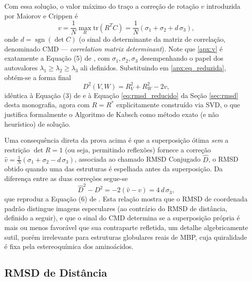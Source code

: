 \documentclass[12pt, a4paper]{article}
\DeclareMathOperator{\sgn}{sgn}
\theoremstyle{plain}
\theoremstyle{definition}
\theoremstyle{remark}
\newcommand{\ident}{\hspace{2em}}
\begin{document}
\ident Com essa solução, o valor máximo do traço a correção de rotação $v$ introduzida por Maiorov e Crippen \cite{maiorov1994} é
\begin{equation}
    v = \frac{1}{N}\max_R \mathrm{tr}(R^TC) = \frac{1}{N}\left(\sigma_1+\sigma_2+d\,\sigma_3\right),
    \label{apx:v}
\end{equation}
onde $d = \sgn(\det C)$ (o sinal do determinante da matriz de
correlação, denominado CMD --- \emph{correlation matrix determinant}). Note
que \eqref{apx:v} é exatamente a Equação (5) de \cite{maiorov1994}, com
$\sigma_1,\sigma_2,\sigma_3$ desempenhando o papel dos autovalores
$\lambda_1\ge\lambda_2\ge\lambda_3$ ali definidos. Substituindo em
\eqref{apx:eq_reduzida}, obtém-se a forma final
\begin{equation*}
    D^2(V,W) = R_V^2 + R_W^2 - 2v,
\end{equation*}
idêntica à Equação (3) de \cite{maiorov1994} e à Equação \eqref{eq:rmsd_reducido} da Seção \ref{sec:rmsd} desta monografia, agora com $R = R^*$ explicitamente construído via SVD, o que
justifica formalmente o Algoritmo de Kabsch como método exato (e não
heurístico) de solução.

\ident Uma consequência direta da prova acima é que a superposição ótima
\emph{sem} a restrição $\det R=1$ (ou seja, permitindo reflexões) fornece a
correção $\hat v = \frac{1}{N}(\sigma_1+\sigma_2-d\,\sigma_3)$, associada ao
chamado RMSD Conjugado $\hat D$, o RMSD obtido quando uma das
estruturas é espelhada antes da superposição. Da diferença entre as duas
correções segue-se
\begin{equation*}
    \hat D^2 - D^2 = -2(\hat v - v) = 4\,d\,\sigma_3,
\end{equation*}
que reproduz a Equação (6) de \cite{maiorov1994}. Esta relação mostra que o
RMSD de coordenada padrão distingue imagens especulares (ao contrário
do RMSD de distância, definido a seguir), e que o sinal do CMD determina se a
superposição própria é mais ou menos favorável que sua contraparte
refletida, um detalhe algebricamente sutil, porém irrelevante para
estruturas globulares reais de MBP, cuja quiralidade é fixa pela
estereoquímica dos aminoácidos.

\subsection{RMSD de Distância}
\end{document}
